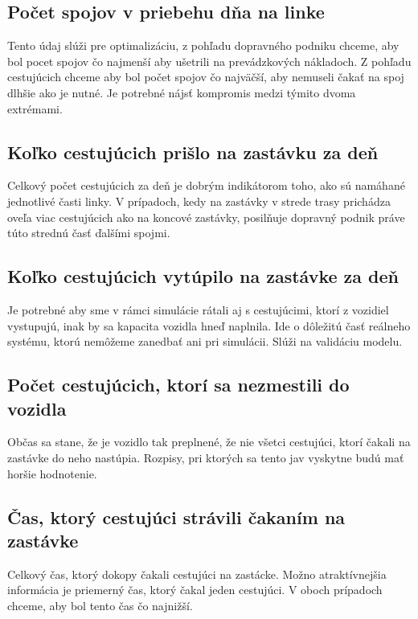 \subsection*{Počet spojov v priebehu dňa na linke}
Tento údaj slúži pre optimalizáciu, z pohľadu dopravného podniku chceme, aby bol pocet spojov čo najmenší aby ušetrili na prevádzkových nákladoch.
Z pohľadu cestujúcich chceme aby bol počet spojov čo najväčší, aby nemuseli čakať na spoj dlhšie ako je nutné.
Je potrebné nájsť kompromis medzi týmito dvoma extrémami.

\subsection*{Koľko cestujúcich prišlo na zastávku za deň}
Celkový počet cestujúcich za deň je dobrým indikátorom toho, ako sú namáhané jednotlivé časti linky.
V prípadoch, kedy na zastávky v strede trasy prichádza oveľa viac cestujúcich ako na koncové zastávky, posilňuje dopravný podnik práve túto strednú časť ďalšími spojmi.

\subsection*{Koľko cestujúcich vytúpilo na zastávke za deň}
Je potrebné aby sme v rámci simulácie rátali aj s cestujúcimi, ktorí z vozidiel vystupujú, inak by sa kapacita vozidla hneď naplnila.
Ide o dôležitú časť reálneho systému, ktorú nemôžeme zanedbať ani pri simulácii.
Slúži na validáciu modelu.

\subsection*{Počet cestujúcich, ktorí sa nezmestili do vozidla}
Občas sa stane, že je vozidlo tak preplnené, že nie všetci cestujúci, ktorí čakali na zastávke do neho nastúpia.
Rozpisy, pri ktorých sa tento jav vyskytne budú mať horšie hodnotenie.

\subsection*{Čas, ktorý cestujúci strávili čakaním na zastávke}
Celkový čas, ktorý dokopy čakali cestujúci na zastácke.
Možno atraktívnejšia informácia je priemerný čas, ktorý čakal jeden cestujúci.
V oboch prípadoch chceme, aby bol tento čas čo najnižší.

